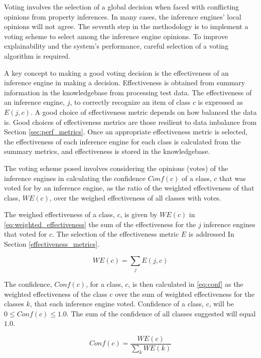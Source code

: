 Voting involves the selection of a global decision when faced with conflicting
opinions from property inferences. In many cases, the inference engines' local
opinions will not agree. The seventh step in the methodology is to implement a
voting scheme to select among the inference engine opinions. To improve
explainability and the system's performance, careful selection of a voting
algorithm is required.

A key concept to making a good voting decision is the effectiveness of an
inference engine in making a decision. Effectiveness is obtained from summary
information in the knowledgebase from processing test data. The effectiveness of
an inference engine, $j$, to correctly recognize an item of class $c$ is
expressed as $E(j,c)$. A good choice of effectiveness metric depends on how
balanced the data is. Good choices of effectiveness metrics are those resilient
to data imbalance from Section \ref{sec:perf_metrics}. Once an appropriate
effectiveness metric is selected, the effectiveness of each inference engine for
each class is calculated from the summary metrics, and effectiveness is stored
in the knowledgebase.

The voting scheme posed involves considering the opinions (votes) of the
inference engines in calculating the confidence $Conf(c)$ of a class, $c$ that
was voted for by an inference engine, as the ratio of the weighted effectiveness
of that class, $WE(c)$, over the weighed effectiveness of all classes with
votes.

The weighed effectiveness of a class, $c$, is given by $WE(c)$ in
\eqref{eq:weighted_effectiveness} the sum of the effectiveness for the $j$
inference engines that voted for $c$. The selection of the effectiveness metric
$E$ is addressed In Section \ref{effectiveness_metrics}. 

\begin{equation}\label{eq:weighted_effectiveness}
    WE(c)=\sum_j E(j, c)
\end{equation}

The confidence, $Conf(c)$, for a class, $c$, is then calculated in
\eqref{eq:conf} as the weighted effectiveness of the class $c$ over the sum of
weighted effectiveness for the classes $k$, that each inference engine voted.
Confidence of a class, $c$, will be $0 \leq Conf(c) \leq 1.0$. The sum of the
confidence of all classes suggested will equal $1.0$.

\begin{equation}\label{eq:conf}
    Conf(c)=\frac{WE(c)}{\sum\limits_kWE(k)}
\end{equation}

